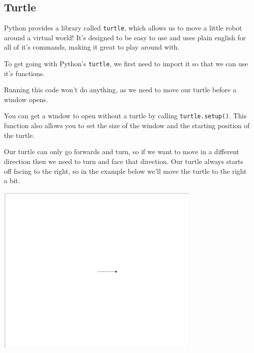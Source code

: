 	\subsection{Turtle}

		Python provides a library called \texttt{turtle}, which allows us to move a little robot around a virtual world! It's designed to be easy to use and uses plain english for all of it's commands, making it great to play around with.

		To get going with Python's \texttt{turtle}, we first need to import it so that we can use it's functions.

		

		Running this code won't do anything, as we need to move our turtle before a window opens.

		\begin{aside}
			You can get a window to open without a turtle by calling \texttt{turtle.setup()}. This function also allows you to set the size of the window and the starting position of the turtle.
		\end{aside}

		Our turtle can only go forwards and turn, so if we want to move in a different direction then we need to turn and face that direction. Our turtle always starts off facing to the right, so in the example below we'll move the turtle to the right a bit.

		

		\begin{center}
			\includegraphics[width=100mm]{McrRaspJam/014_Python/3_exercises/turtle/move}
		\end{center}

